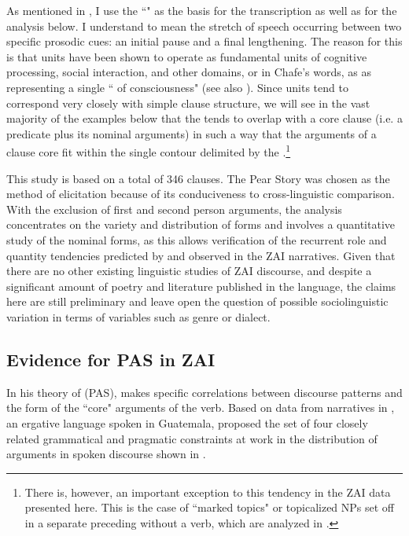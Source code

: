 As mentioned in , I use the ``" \citep{chafe1994} as the basis for the transcription as well as for the analysis below. I understand  to mean the stretch of speech occurring between two specific prosodic cues: an initial pause and a final lengthening. The reason for this is that  units have been shown to operate as fundamental units of cognitive processing, social interaction, and other domains, or in Chafe's words, as as representing a single `` of consciousness" (see also \citealt{dubois1993}). Since  units tend to correspond very closely with simple clause structure, we will see in the vast majority of the examples below that the  tends to overlap with a core clause (i.e. a predicate plus its nominal arguments) in such a way that the arguments of a clause core fit within the single  contour delimited by the .\footnote{There is, however, an important exception to this tendency in the ZAI data presented here. This is the case of ``marked topics" or topicalized NPs set off in a separate preceding  without a verb, which are analyzed in .}

This study is based on a total of 346 clauses. The Pear Story was chosen as the method of elicitation because of its conduciveness to cross-linguistic comparison. With the exclusion of first and second person arguments, the analysis concentrates on the variety and distribution of  forms and involves a quantitative study of the nominal forms, as this allows verification of the recurrent role and quantity tendencies predicted by  and observed in the ZAI narratives. Given that there are no other existing linguistic studies of ZAI discourse, and despite a significant amount of poetry and literature published in the language, the claims here are still preliminary and leave open the question of possible sociolinguistic variation in terms of variables such as genre or dialect.


\subsection{Evidence for PAS in ZAI}\label{evidenceforpas}

In his theory of  (PAS), \citet{dubois1987,dubois2003a,dubois2003b} makes specific correlations between discourse patterns and the form of the ``core" arguments of the verb. Based on data from narratives in , an ergative language spoken in Guatemala, \citet{dubois1987} proposed the set of four closely related grammatical and pragmatic constraints at work in the distribution of arguments in spoken discourse shown in .

